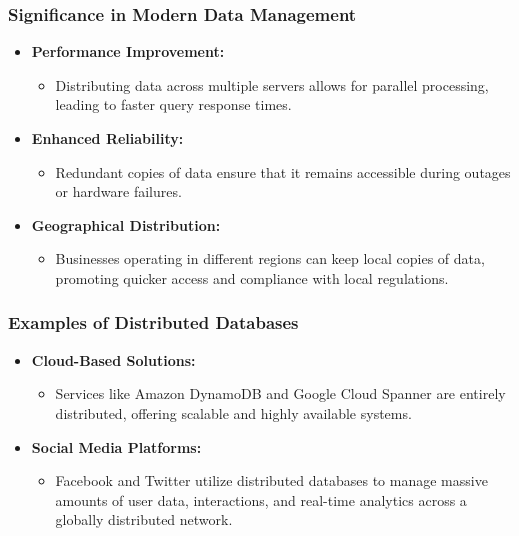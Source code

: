 \documentclass[aspectratio=169]{beamer}
\begin{document}
\begin{frame}[fragile]
    \frametitle{Significance in Modern Data Management}
    \begin{itemize}
        \item \textbf{Performance Improvement:} 
            \begin{itemize}
                \item Distributing data across multiple servers allows for parallel processing, leading to faster query response times.
            \end{itemize}
        \item \textbf{Enhanced Reliability:}
            \begin{itemize}
                \item Redundant copies of data ensure that it remains accessible during outages or hardware failures.
            \end{itemize}
        \item \textbf{Geographical Distribution:} 
            \begin{itemize}
                \item Businesses operating in different regions can keep local copies of data, promoting quicker access and compliance with local regulations.
            \end{itemize}
    \end{itemize}
\end{frame}

\begin{frame}[fragile]
    \frametitle{Examples of Distributed Databases}
    \begin{itemize}
        \item \textbf{Cloud-Based Solutions:} 
            \begin{itemize}
                \item Services like Amazon DynamoDB and Google Cloud Spanner are entirely distributed, offering scalable and highly available systems.
            \end{itemize}
        \item \textbf{Social Media Platforms:}
            \begin{itemize}
                \item Facebook and Twitter utilize distributed databases to manage massive amounts of user data, interactions, and real-time analytics across a globally distributed network.
            \end{itemize}
    \end{itemize}
\end{frame}
\end{document}
